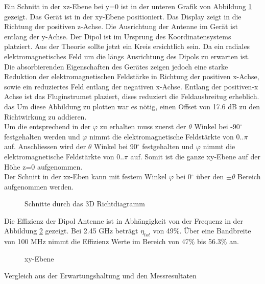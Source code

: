 Ein Schnitt in der xz-Ebene bei y=0 ist in der unteren Grafik von Abbildung \ref{fig:Schnittgemessen} gezeigt. Das Gerät ist in der xy-Ebene positioniert. Das Display zeigt in die Richtung der positiven z-Achse. Die Ausrichtung der Antenne im Gerät ist entlang der y-Achse. Der Dipol ist im Ursprung des Koordinatensystems platziert. Aus der Theorie sollte jetzt ein Kreis ersichtlich sein. Da ein radiales elektromagnetisches Feld um die längs Ausrichtung des Dipols zu erwarten ist. Die absorbierenden Eigenschaften des Gerätes zeigen jedoch eine starke Reduktion der elektromagnetischen Feldstärke in Richtung der positiven x-Achse, sowie ein reduziertes Feld entlang der negativen x-Achse. Entlang der positiven-x Achse ist das Fluginstrumet plaziert, dises reduziert die Feldausbreitug erheblich. das Um diese Abbildung zu plotten war es nötig, einen Offset von 17.6 dB zu den Richtwirkung zu addieren.\\
Um die entsprechend in der $\varphi$ zu erhalten muss zuerst der $\theta$ Winkel bei -90$^\circ$ festgehalten werden und $\varphi$ nimmt die elektromagnetische Feldstärkte von $0..\pi$ auf. Anschliessen wird der $\theta$ Winkel bei 90$^\circ$ festgehalten  und $\varphi$ nimmt die elektromagnetische Feldstärkte von $0..\pi$ auf. Somit ist die ganze xy-Ebene auf der Höhe z=0 aufgenommen.\\
Der Schnitt in der xz-Eben kann mit festem Winkel $\varphi$ bei 0$^\circ$ über den  $\pm \theta$ Bereich aufgenommen werden.
\begin{figure}[!h]
	\centering
	\begingroup
	
	\endgroup
	\caption{Schnitte durch das 3D Richtdiagramm}
	\label{fig:Schnittgemessen}
\end{figure}
\newpage
Die Effizienz der Dipol Antenne ist in Abhängigkeit von der Frequenz in der Abbildung \ref{fig:Effizienz_gemessen} gezeigt. Bei 2.45 GHz beträgt $\eta_{tot}$ von 49$\%$. Über eine Bandbreite von 100 MHz nimmt die Effizienz Werte im Bereich von 47$\%$ bis 56.3$\%$ an.\\
\begin{figure}[!h]
	\centering
	\begingroup
	
	\endgroup
	\caption{xy-Ebene}\label{fig:Effizienz_gemessen}
\end{figure}

Vergleich aus der Erwartungshaltung und den Messresultaten

